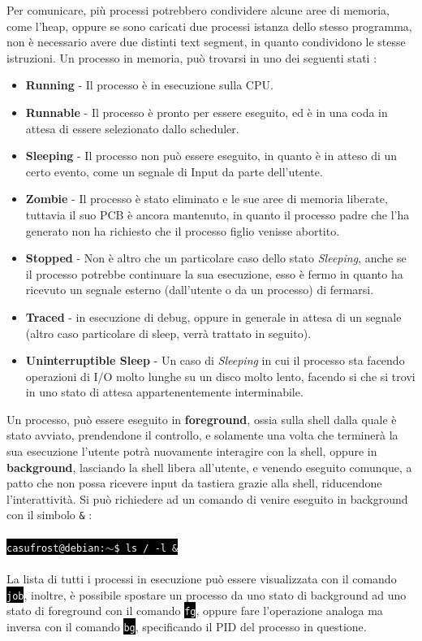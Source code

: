 \documentclass[12pt, letterpaper]{article}
\makeatletter
\newcommand{\code}[1]{\colorbox{light-gray}{\texttt{#1}}}
\newcommand{\shelll}[1]{\colorbox{black}{\textcolor{white}{\texttt{#1}}}}
\newcommand{\shell}[1]{\colorbox{black}{\textcolor{white}{\texttt{casufrost@debian:$\sim$\$ #1}}}}
\newcommand{\acc}{\\\hphantom{}\\}
\makeatother
\begin{document}
Per comunicare, più processi potrebbero condividere alcune aree di memoria, come l'heap, oppure se sono caricati due processi 
istanza dello stesso programma, non è necessario avere due distinti text segment, in quanto condividono le stesse istruzioni. Un 
processo in memoria, può trovarsi in uno dei seguenti stati : \begin{itemize}
    \item \textbf{Running} - Il processo è in esecuzione sulla CPU.
    \item \textbf{Runnable} - Il processo è pronto per essere eseguito, ed è in una coda in attesa di essere selezionato dallo
    scheduler.
    \item \textbf{Sleeping} - Il processo non può essere eseguito, in quanto è in atteso di un certo evento, come un segnale di Input 
    da parte dell'utente.
    \item \textbf{Zombie} - Il processo è stato eliminato e le sue aree di memoria liberate, tuttavia il suo PCB è ancora 
    mantenuto, in quanto il processo padre che l'ha generato non ha richiesto che il processo figlio venisse abortito.
    \item \textbf{Stopped} - Non è altro che un particolare caso dello stato \textit{Sleeping}, anche se il processo potrebbe 
    continuare la sua esecuzione, esso è fermo in quanto ha ricevuto un segnale esterno (dall'utente o da un processo) di fermarsi.
    \item \textbf{Traced} - in esecuzione di debug, oppure in generale in attesa di un segnale (altro caso
    particolare di sleep, verrà trattato in seguito).
    \item \textbf{Uninterruptible Sleep} - Un caso di \textit{Sleeping} in cui il processo sta facendo operazioni di I/O molto 
    lunghe su un disco molto lento, facendo si che si trovi in uno stato di attesa appartenentemente interminabile.
\end{itemize}
Un processo, può essere eseguito in \textbf{foreground}, ossia sulla shell dalla quale è stato avviato, prendendone il controllo, 
e solamente una volta che terminerà la sua esecuzione l'utente potrà nuovamente interagire con la shell, oppure in
\textbf{background}, lasciando la shell libera all'utente, e venendo eseguito comunque, a patto che non possa ricevere 
input da tastiera grazie alla shell, riducendone l'interattività. Si può richiedere ad un comando di venire eseguito in 
background con il simbolo \code{\&} :\acc
\shell{ls / -l \&}
\acc
La lista di tutti i processi in esecuzione può essere visualizzata con il comando \shelll{job}, inoltre, è possibile 
spostare un processo da uno stato di background ad uno stato di foreground con il comando \shelll{fg}, oppure
fare l'operazione analoga ma inversa con il comando \shelll{bg}, specificando il PID del processo in questione.
\end{document}
